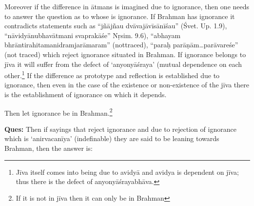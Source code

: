 \eject

Moreover if the difference in ātmans is imagined due to ignorance, then one needs to answer the question as to whose is ignorance. If Brahman has ignorance it contradicts statements such as “jñājñau dvāvajāvīsānīśau” (Śvet. Up. 1.9), “nāvidyānubhavātmani svaprakāśe” Nṛsim. 9.6), “abhayam bhrāntirahitamanidramjarāmaram” (not\break traced), “paraḥ parāṇām…parāvareśe” (not traced) which reject ignorance situated in Brahman. If ignorance belongs to jīva it will suffer from the defect of ‘anyonyāśraya’ (mutual dependence on each other.\footnote{Jīva itself comes into being due to avidyā and avidya is dependent on jīva; thus there is the defect of anyonyāśrayabhāva.} If the difference as prototype and reflection is established due to ignorance, then even in the case of the existence or non-existence of the jīva there is the establishment of ignorance on which it depends. 


Then let ignorance be in Brahman.\footnote{If it is not in jīva then it can only be in Brahman} 

\textbf{Ques:} Then if sayings that reject ignorance and due to rejection of ignorance which is ‘anirvacanīya’ (indefinable) they are said to be leaning towards Brahman, then the answer is: 

